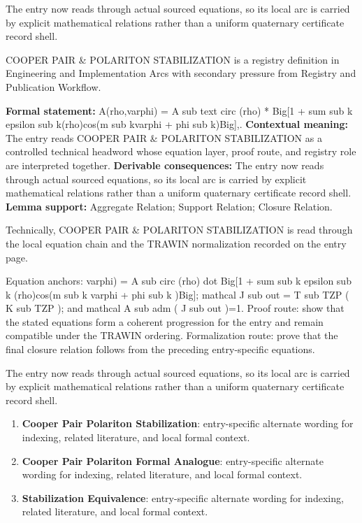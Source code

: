 The entry now reads through actual sourced equations, so its local arc is carried by explicit mathematical relations rather than a uniform quaternary certificate record shell.
\clearpage


\begingroup\small
{}
COOPER PAIR \& POLARITON STABILIZATION is a registry definition in Engineering and Implementation Arcs with secondary pressure from Registry and Publication Workflow.

\begingroup\footnotesize\setlength{\emergencystretch}{3em}\sloppy
\textbf{Formal statement:} A(rho,varphi) = A sub text circ (rho) * Big[1 + sum sub k epsilon sub k(rho)cos(m sub kvarphi + phi sub k)Big],. \textbf{Contextual meaning:} The entry reads COOPER PAIR \& POLARITON STABILIZATION as a controlled technical headword whose equation layer, proof route, and registry role are interpreted together. \textbf{Derivable consequences:} The entry now reads through actual sourced equations, so its local arc is carried by explicit mathematical relations rather than a uniform quaternary certificate record shell. \textbf{Lemma support:} Aggregate Relation; Support Relation; Closure Relation.\par
\endgroup

Technically, COOPER PAIR \& POLARITON STABILIZATION is read through the local equation chain and the TRAWIN normalization recorded on the entry page.

Equation anchors: varphi) = A sub circ (rho) dot Big[1 + sum sub k epsilon sub k (rho)cos(m sub k varphi + phi sub k )Big]; mathcal J sub out = T sub TZP ( K sub TZP ); and mathcal A sub adm ( J sub out )=1. Proof route: show that the stated equations form a coherent progression for the entry and remain compatible under the TRAWIN ordering. Formalization route: prove that the final closure relation follows from the preceding entry-specific equations.

The entry now reads through actual sourced equations, so its local arc is carried by explicit mathematical relations rather than a uniform quaternary certificate record shell.
\endgroup

\begin{enumerate}[leftmargin=1.6em,itemsep=6pt,topsep=4pt]
\item \textbf{Cooper Pair Polariton Stabilization}: entry-specific alternate wording for indexing, related literature, and local formal context.
\item \textbf{Cooper Pair Polariton Formal Analogue}: entry-specific alternate wording for indexing, related literature, and local formal context.
\item \textbf{Stabilization Equivalence}: entry-specific alternate wording for indexing, related literature, and local formal context.
\end{enumerate}

